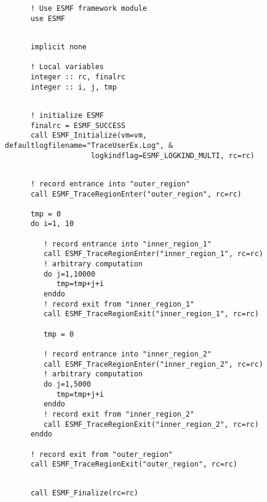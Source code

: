  \begin{verbatim}
      ! Use ESMF framework module
      use ESMF
 
\end{verbatim}
 

 \begin{verbatim}
      implicit none

      ! Local variables  
      integer :: rc, finalrc
      integer :: i, j, tmp                 
 
\end{verbatim}
 

 \begin{verbatim}
      ! initialize ESMF
      finalrc = ESMF_SUCCESS
      call ESMF_Initialize(vm=vm, defaultlogfilename="TraceUserEx.Log", &
                    logkindflag=ESMF_LOGKIND_MULTI, rc=rc)
 
\end{verbatim}
 

 \begin{verbatim}
      ! record entrance into "outer_region"
      call ESMF_TraceRegionEnter("outer_region", rc=rc)

      tmp = 0
      do i=1, 10
         
         ! record entrance into "inner_region_1"
         call ESMF_TraceRegionEnter("inner_region_1", rc=rc)
         ! arbitrary computation
         do j=1,10000
            tmp=tmp+j+i
         enddo
         ! record exit from "inner_region_1"
         call ESMF_TraceRegionExit("inner_region_1", rc=rc)

         tmp = 0
         
         ! record entrance into "inner_region_2"
         call ESMF_TraceRegionEnter("inner_region_2", rc=rc)
         ! arbitrary computation
         do j=1,5000
            tmp=tmp+j+i
         enddo
         ! record exit from "inner_region_2"
         call ESMF_TraceRegionExit("inner_region_2", rc=rc)
      enddo

      ! record exit from "outer_region"
      call ESMF_TraceRegionExit("outer_region", rc=rc)
 
\end{verbatim}
 

 \begin{verbatim}
      call ESMF_Finalize(rc=rc)
 
\end{verbatim}

\setlength{\parskip}{\oldparskip}
\setlength{\parindent}{\oldparindent}
\setlength{\baselineskip}{\oldbaselineskip}
